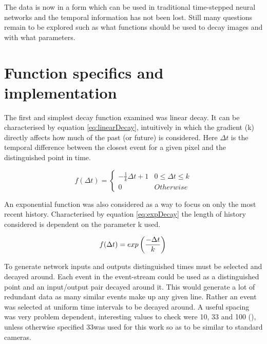 The data is now in a form which can be used in traditional time-stepped neural networks and the temporal information has not been lost.
Still many questions remain to be explored such as what functions should be used to decay images and with what parameters.


\section{Function specifics and implementation}

The first and simplest decay function examined was linear decay. 
It can be characterised by equation \ref{eq:linearDecay}, intuitively in which the gradient (k) directly affects how much of the past (or future) is considered. 
Here $\Delta t$ is the temporal difference between the closest event for a given pixel and the distinguished point in time. 


\begin{equation}
 \label{eq:linearDecay}
    f(\Delta t) = 
    \begin{cases}
    -\frac{1}{k}  \Delta t + 1 & 0\leq \Delta t \leq k \\
    0 & Otherwise
   \end{cases}
\end{equation}

An exponential function was also considered as a way to focus on only the most recent history.
Characterised by equation \ref{eq:expDecay} the length of history considered is dependent on the parameter k used. 

\begin{equation}
 \label{eq:expDecay}
    f(\Delta t) = exp\left(\frac{-\Delta t}{k}\right) \\
\end{equation}

To generate network inputs and outputs distinguished times must be selected and decayed around.
Each event in the event-stream could be used as a distinguished point and an input/output pair decayed around it.
This would generate a lot of redundant data as many similar events make up any given line.
Rather an event was selected at uniform time intervals to be decayed around.
A useful spacing was very problem dependent, interesting values to check were 10, 33 and 100 (\ms), unless otherwise specified 33\ms was used for this work so as to be similar to standard cameras. 
 


